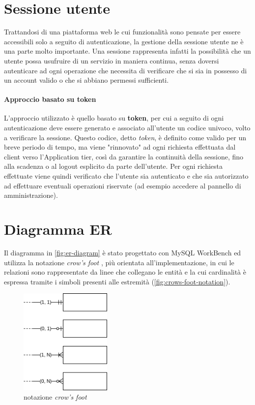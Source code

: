 \section{Sessione utente}
Trattandosi di una piattaforma web le cui funzionalità sono pensate per essere
accessibili solo a seguito di autenticazione, la gestione della sessione utente
ne è una parte molto importante. Una sessione rappresenta infatti la possibilità
che un utente possa usufruire di un servizio in maniera continua, senza doversi
autenticare ad ogni operazione che necessita di verificare che si sia in possesso
di un account valido o che si abbiano permessi sufficienti.

\paragraph{Approccio basato su token}
L'approccio utilizzato è quello basato su \textbf{token}, per cui a seguito
di ogni autenticazione deve essere generato e associato all'utente un codice
univoco, volto a verificare la sessione. Questo codice, detto \textit{token}, è
definito come valido per un breve periodo di tempo, ma viene "rinnovato" ad ogni
richiesta effettuata dal client verso l'Application tier, così da garantire la
continuità della sessione, fino alla scadenza o al logout esplicito da parte
dell'utente.
Per ogni richiesta effettuate viene quindi verificato che l'utente sia autenticato
e che sia autorizzato ad effettuare eventuali operazioni riservate (ad esempio
accedere al pannello di amministrazione).


\section{Diagramma ER}

Il diagramma in \autoref{fig:er-diagram} è stato progettato con MySQL WorkBench
\cite{workbench:9-EER} ed utilizza la notazione \textit{crow's foot}
\cite{wiki:crows-foot}, più orientata all'implementazione, in cui le relazioni
sono rappresentate da linee che collegano le entità e la cui cardinalità è
espressa tramite i simboli presenti alle estremità (\autoref{fig:crows-foot-notation}).

\begin{figure}[ht]
	\centering
	\includegraphics[width=0.4\textwidth]{assets/diagrams/crows-foot-notation.png}
	\cprotect\caption{notazione \textit{crow's foot}}
	\label{fig:crows-foot-notation}
\end{figure}

